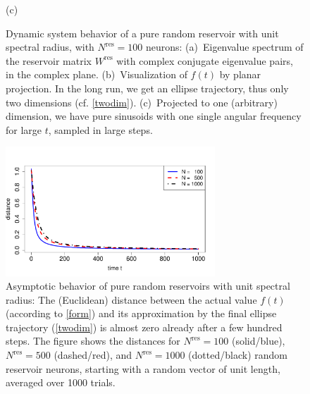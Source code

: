 \documentclass[twoside,11pt]{article}
\theoremstyle{definition}
\begin{document}
\begin{figure}[h]
    (c) 
  \caption{Dynamic system behavior of a pure random reservoir with unit spectral
	radius, with $N^\mathrm{res} = 100$ neurons:
    (a)~Eigenvalue spectrum of the reservoir matrix $W^\mathrm{res}$ with
	complex conjugate eigenvalue pairs, in the complex plane.
    (b)~Visualization of $f(t)$ by planar projection. In the long run, we get an
	ellipse trajectory, thus only two dimensions (cf. \cref{twodim}).
    (c)~Projected to one (arbitrary) dimension, we have pure sinusoids with one
	single angular frequency for large $t$, sampled in large steps.}
  \label{ell}
\end{figure}

\begin{figure}
 \centering
 \includegraphics[width=0.7\textwidth]{fig/asymptot0} %
  \caption{Asymptotic behavior of pure random reservoirs with unit spectral radius:
	The (Euclidean) distance between the actual value $f(t)$
	(according to \cref{form}) and its approximation by the final ellipse
	trajectory (\cref{twodim}) is almost zero already after a few hundred
	steps. The figure shows the distances for $N^\mathrm{res}=100$ (solid/blue), $N^\mathrm{res}=500$
	(dashed/red), and $N^\mathrm{res}=1000$ (dotted/black) random reservoir neurons,
	starting with a random vector of unit length, averaged over 1000 trials.}
  \label{asymptot}
\end{figure}
\end{document}
